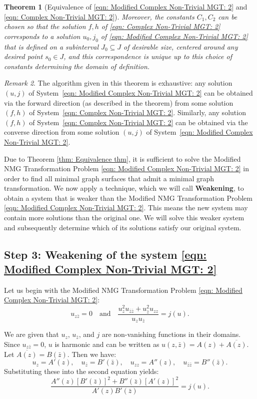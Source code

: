 \documentclass[12pt]{article}
\theoremstyle{plain}
\newtheorem{theorem}{Theorem}[section]
\theoremstyle{definition}
\theoremstyle{remark}
\newtheorem{remark}[theorem]{Remark}
\begin{document}
\begin{theorem}[Equivalence of \ref{eqn: Modified Complex Non-Trivial MGT: 2} and \ref{eqn: Complex Non-Trivial MGT: 2}]
	Moreover, the constants $C_1,C_2$ can be chosen so that the solution \(f,h\) of \ref{eqn: Complex Non-Trivial MGT: 2} corresponds to a solution \(u_0,j_0\) of \ref{eqn: Modified Complex Non-Trivial MGT: 2} that is defined on a subinterval \(J_0 \subseteq J\) of desirable size, centered around any  desired point \(s_0\in J\), and this correspondence is unique up to this choice of constants determining the domain of definition.
\end{theorem}  

\begin{remark}
	The algorithm given in this theorem is exhaustive: any solution \((u,j)\) of System~\ref{eqn: Modified Complex Non-Trivial MGT: 2} can be obtained via the forward direction (as described in the theorem) from some solution \((f,h)\) of System~\ref{eqn: Complex Non-Trivial MGT: 2}. Similarly, any solution \((f,h)\) of System~\ref{eqn: Complex Non-Trivial MGT: 2} can be obtained via the converse direction from some solution \((u,j)\) of System~\ref{eqn: Modified Complex Non-Trivial MGT: 2}.
\end{remark}

Due to Theorem \ref{thm: Equivalence thm}, it is sufficient to solve the Modified NMG Transformation Problem \ref{eqn: Modified Complex Non-Trivial MGT: 2} in order to find all minimal graph surfaces that admit a minimal graph transformation. We now apply a technique, which we will call \textbf{Weakening}, to obtain a system that is weaker than the Modified NMG Transformation Problem \ref{eqn: Modified Complex Non-Trivial MGT: 2}. This means the new system may contain more solutions than the original one. We will solve this weaker system and subsequently determine which of its solutions satisfy our original system.

\subsection{Step 3: Weakening of the system \ref{eqn: Modified Complex Non-Trivial MGT: 2}}
Let us begin with the Modified NMG Transformation Problem \ref{eqn: Modified Complex Non-Trivial MGT: 2}:
\[
u_{z\bar{z}} = 0 \quad \text{and} \quad \frac{u_z^2 u_{\bar{z}\bar{z}} + u_{\bar{z}}^2 u_{zz}}{u_z u_{\bar{z}}} = j(u).
\]

We are given that \(u_z\), \(u_{\bar{z}}\), and \(j\) are non-vanishing functions in their domains. Since \(u_{z\bar{z}} = 0\), \(u\) is harmonic and can be written as \(u(z,\bar{z}) = A(z) + \overline{A(z)}\). Let \(\overline{A(z)} = B(\bar{z})\). Then we have:
\[
u_z = A'(z), \quad u_{\bar{z}} = B'(\bar{z}), \quad u_{zz} = A''(z), \quad u_{\bar{z}\bar{z}} = B''(\bar{z}).
\]
Substituting these into the second equation yields:
\[
\frac{A''(z) [B'(\bar{z})]^2 + B''(\bar{z}) [A'(z)]^2}{A'(z) B'(\bar{z})} = j(u).
\]
\end{document}
